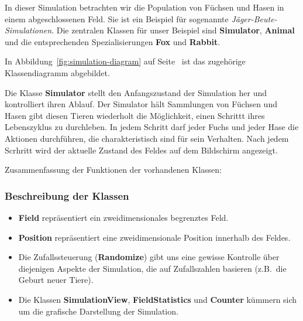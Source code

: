 
In dieser Simulation betrachten wir die Population von Füchsen und Hasen
in einem abgeschlossenen Feld. Sie ist ein Beispiel für sogenannte
\emph{Jäger-Beute-Simulationen}. Die zentralen Klassen für unser Beispiel
sind \textbf{Simulator}, \textbf{Animal} und die entsprechenden Spezialisierungen
\textbf{Fox} und \textbf{Rabbit}.

In Abbildung~\ref{fig:simulation-diagram} auf Seite~\pageref{fig:simulation-diagram}
ist das zugehörige Klassendiagramm abgebildet.

Die Klasse \textbf{Simulator} stellt den Anfangszustand der Simulation her
und kontrolliert ihren Ablauf. Der Simulator hält Sammlungen von Füchsen und
Hasen gibt diesen Tieren wiederholt die Möglichkeit, einen Schrittt ihres
Lebenszyklus zu durchleben. In jedem Schritt darf jeder Fuchs und jeder
Hase die Aktionen durchführen, die charakteristisch sind für sein Verhalten.
Nach jedem Scrhritt wird der aktuelle Zustand des Feldes auf dem Bildschirm
angezeigt.

Zusammenfassung der Funktionen der vorhandenen Klassen:

\begin{frame}[fragile]
    \frametitle<presentation>{Beschreibung der Klassen}

    \begin{itemize}
        \item\textbf{Field} repräsentiert ein zweidimensionales begrenztes Feld.
        \item\textbf{Position} repräsentiert eine zweidimensionale Position
            innerhalb des Feldes.
        \item Die Zufallssteuerung (\textbf{Randomize}) gibt uns eine gewisse
            Kontrolle über diejenigen Aspekte der Simulation, die auf
            Zufallszahlen basieren (z.B.~die Geburt neuer Tiere).
        \item Die Klassen \textbf{SimulationView}, \textbf{FieldStatistics} und
            \textbf{Counter} kümmern sich um die grafische Darstellung
            der Simulation.
    \end{itemize}
\end{frame}

